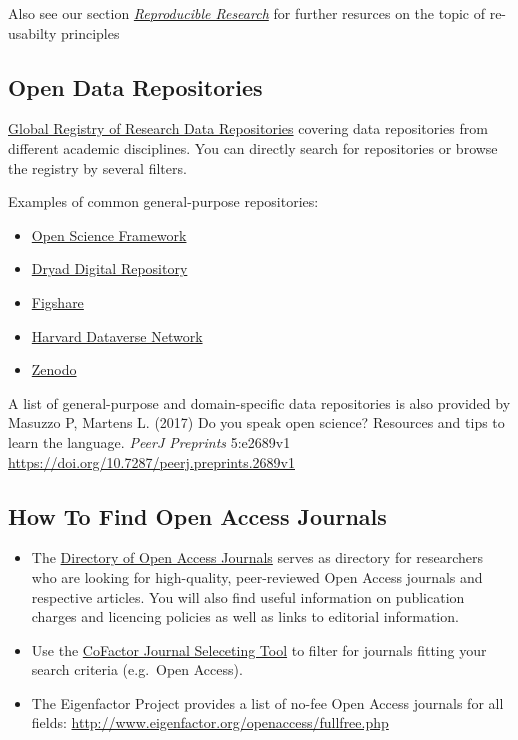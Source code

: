 \documentclass[12pt,]{report}
\providecommand{\tightlist}{%
  \setlength{\itemsep}{0pt}\setlength{\parskip}{0pt}}
\begin{document}
Also see our section
\protect\hyperlink{repro_research}{\emph{Reproducible Research}} for
further resurces on the topic of re-usabilty principles

\subsection{Open Data Repositories}\label{open-data-repositories}

\href{https://www.re3data.org/}{Global Registry of Research Data
Repositories} covering data repositories from different academic
disciplines. You can directly search for repositories or browse the
registry by several filters.

Examples of common general-purpose repositories:

\begin{itemize}
\tightlist
\item
  \href{https://osf.io/}{Open Science Framework}
\item
  \href{https://datadryad.org/}{Dryad Digital Repository}
\item
  \href{https://figshare.com/}{Figshare}
\item
  \href{https://dataverse.harvard.edu/}{Harvard Dataverse Network}
\item
  \href{https://zenodo.org/}{Zenodo}
\end{itemize}

A list of general-purpose and domain-specific data repositories is also
provided by Masuzzo P, Martens L. (2017) Do you speak open science?
Resources and tips to learn the language. \emph{PeerJ Preprints}
5:e2689v1 \url{https://doi.org/10.7287/peerj.preprints.2689v1}

\subsection{How To Find Open Access
Journals}\label{how-to-find-open-access-journals}

\begin{itemize}
\tightlist
\item
  The \href{https://doaj.org/}{Directory of Open Access Journals} serves
  as directory for researchers who are looking for high-quality,
  peer-reviewed Open Access journals and respective articles. You will
  also find useful information on publication charges and licencing
  policies as well as links to editorial information.
\item
  Use the \href{http://cofactorscience.com/journal-selector}{CoFactor
  Journal Seleceting Tool} to filter for journals fitting your search
  criteria (e.g.~Open Access).
\item
  The Eigenfactor Project provides a list of no-fee Open Access journals
  for all fields:
  \url{http://www.eigenfactor.org/openaccess/fullfree.php}
\end{itemize}
\end{document}
